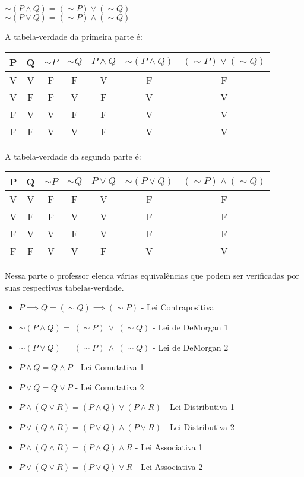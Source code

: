 \documentclass[a4paper,11pt]{book}
\theoremstyle{definition}
\theoremstyle{break}
\begin{document}
\begin{center}
$\sim(P \land Q) = (\sim P) \lor (\sim Q)$ \\
$\sim(P \lor Q) = (\sim P) \land (\sim Q)$
\end{center}

A tabela-verdade da primeira parte é:
\begin{center}
\begin{tabular}{ | c c || c c c || c c | }
\hline
P & Q & $\sim P$ & $\sim Q$ & $P \land Q$ & $\sim (P \land Q)$ & $(\sim P) \lor (\sim Q)$ \\
\hline
V & V & F & F & V & F & F \\
V & F & F & V & F & V & V \\
F & V & V & F & F & V & V \\
F & F & V & V & F & V & V \\
\hline
\end{tabular}
\end{center}

A tabela-verdade da segunda parte é:
\begin{center}
\begin{tabular}{ | c c || c c c || c c | }
\hline
P & Q & $\sim P$ & $\sim Q$ & $P \lor Q$ & $\sim (P \lor Q)$ & $(\sim P) \land (\sim Q)$ \\
\hline
V & V & F & F & V & F & F \\
V & F & F & V & V & F & F \\
F & V & V & F & V & F & F \\
F & F & V & V & F & V & V \\
\hline
\end{tabular}
\end{center}

Nessa parte o professor elenca várias equivalências que podem ser verificadas por suas respectivas tabelas-verdade.

\begin{itemize}
\item $ P \implies Q = (\sim Q) \implies (\sim P) $ - Lei Contrapositiva
\item $ \sim (P \land Q) = \  (\sim P) \ \lor \ (\sim Q) $ - Lei de DeMorgan 1
\item $ \sim (P \lor Q) = \  (\sim P) \ \land \ (\sim Q) $ - Lei de DeMorgan 2
\item $ P \land Q = Q \land P $ - Lei Comutativa 1
\item $ P \lor Q = Q \lor P $ - Lei Comutativa 2
\item $ P \land (Q \lor R) = (P \land Q) \lor (P \land R)$ - Lei Distributiva 1
\item $ P \lor (Q \land R) = (P \lor Q) \land (P \lor R) $ - Lei Distributiva 2
\item $ P \land (Q \land R) = (P \land Q) \land R $ - Lei Associativa 1
\item $ P \lor (Q \lor R) = (P \lor Q) \lor R $ - Lei Associativa 2
\end{itemize}
\end{document}
